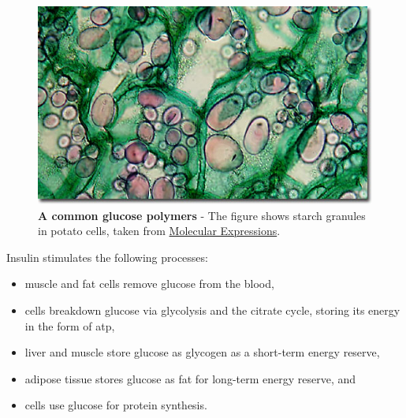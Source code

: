 \begin{figure}[htb]
  \centering
  \includegraphics[width=1\columnwidth]{largepotato}
  \caption[A common glucose polymers]{\textbf{A common glucose polymers} - The figure shows starch granules in potato cells, taken from
  \href{http://molecularexpressions.com/micro/gallery/burgersnfries/burgersnfries4.html}{Molecular Expressions}.}
  \label{fig:largepotato}
\end{figure}



Insulin stimulates the following processes:

\begin{itemize}
\item muscle and fat cells remove glucose from the blood,
\item cells breakdown glucose via glycolysis and the citrate cycle, storing its energy in the form of \gls{atp},
\item liver and muscle store glucose as glycogen as a short-term energy reserve,
\item adipose tissue stores glucose as fat for long-term energy reserve, and
\item cells use glucose for protein synthesis.
\end{itemize}







